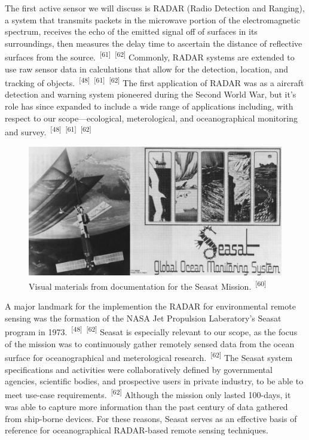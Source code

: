 \documentclass{article}
\begin{document}

\par{The first active sensor we will discuss is RADAR (Radio Detection and Ranging), a system that transmits packets in the microwave portion of the electromagnetic spectrum, receives the echo of the emitted signal off of surfaces in its surroundings, then measures the delay time to ascertain the distance of reflective surfaces from the source.~\textsuperscript{[61]}~\textsuperscript{[62]} Commonly, RADAR systems are extended to use raw sensor data in calculations that allow for the detection, location, and tracking of objects.~\textsuperscript{[48]}~\textsuperscript{[61]}~\textsuperscript{[62]} The first application of RADAR was as a aircraft detection and warning system pioneered during the Second World War, but it's role has since expanded to include a wide range of applications including, with respect to our scope---ecological, meterological, and oceanographical monitoring and survey.~\textsuperscript{[48]}~\textsuperscript{[61]}~\textsuperscript{[62]}}


\begin{figure}
    \centering
    \includegraphics[width=1\linewidth]{images/seasat-material.png}
    \caption{Visual materials from documentation for the Seasat Mission.~\textsuperscript{[60]}}
    \label{figure16}
\end{figure}


\par{A major landmark for the implemention the RADAR for environmental remote sensing was the formation of the NASA Jet Propulsion Laberatory's Seasat program in 1973.~\textsuperscript{[48]}~\textsuperscript{[62]} Seasat is especially relevant to our scope, as the focus of the mission was to continuously gather remotely sensed data from the ocean surface for oceanographical and meterological research.~\textsuperscript{[62]} The Seasat system specifications and activities were collaboratively defined by governmental agencies, scientific bodies, and prospective users in private industry, to be able to meet use-case requirements.~\textsuperscript{[62]} Although the mission only lasted 100-days, it was able to capture more information than the past century of data gathered from ship-borne devices. For these reasons, Seasat serves as an effective basis of reference for oceanographical RADAR-based remote sensing techniques.}
\end{document}
